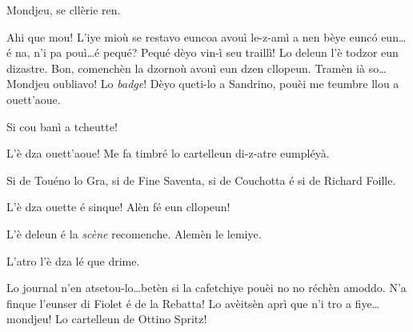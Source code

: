 \begin{drama}
\Spritzspeaks{} Mondjeu,  se cllèrie ren. 

\Spritzspeaks Ahi que mou! L’iye mioù se restavo euncoa avouì le-z-amì a nen bèye eunc\'o eun\ldots é na, n'i pa pouì\ldots é pequé? Pequé dèyo vin-ì seu traillì! Lo deleun l’è todzor eun dizastre. Bon, comenchèn la dzornoù avouì eun dzen cllopeun.  Tramèn ià so\ldots  Mondjeu oubliavo! Lo \textit{badge}! Dèyo queti-lo a Sandrino, pouèi me teumbre llou a ouett'aoue.


\Spritzspeaks Si cou banì a tcheutte!




\Thierryspeaks L'è dza ouett'aoue! Me fa timbré lo cartelleun di-z-atre eumpléyà.


\Thierryspeaks Si de Touéno lo Gra, si de Fine Saventa, si de Couchotta é si de Richard Foille.


\Thierryspeaks L'è dza ouette é sinque! Alèn fé eun cllopeun!


\scene[-- L'è deleun]


\Sandrinospeaks L'è deleun é la \textsl{scène} recomenche. Alemèn le lemiye.


\Sandrinospeaks{} L'atro l'è dza lé que drime.


\Sandrinospeaks Lo journal n'en atsetou-lo\ldots betèn si la cafetchiye pouèi no no réchèn amoddo.  N'a finque l'eunser di Fiolet é de la Rebatta! Lo avèitsèn aprì que n'i tro a fiye\ldots mondjeu! Lo cartelleun de Ottino Spritz!


\end{drama}
